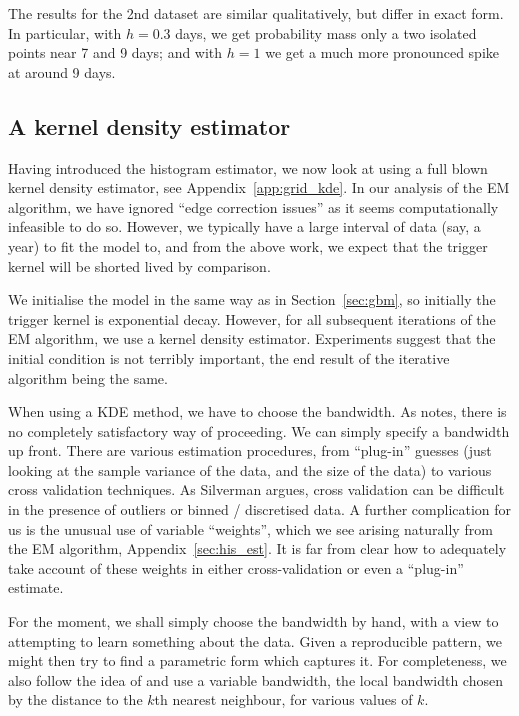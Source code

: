 \documentclass[twoside,a4paper]{article}
\theoremstyle{plain}
\theoremstyle{definition}
\begin{document}
The results for the 2nd dataset are similar qualitatively, but differ in exact form.
In particular, with $h=0.3$ days, we get probability mass only a two isolated points
near 7 and 9 days; and with $h=1$ we get a much more pronounced spike at around 9 days.


\subsection{A kernel density estimator}\label{sec:grid_kde}

Having introduced the histogram estimator, we now look at using a full blown kernel density
estimator, see Appendix~\ref{app:grid_kde}.  In our analysis of the EM algorithm, we have
ignored ``edge correction issues'' as it seems computationally infeasible to do so.  However,
we typically have a large interval of data (say, a year) to fit the model to, and from the above
work, we expect that the trigger kernel will be shorted lived by comparison.

We initialise the model in the same way as in Section~\ref{sec:gbm}, so initially the trigger
kernel is exponential decay.  However, for all subsequent iterations of the EM algorithm,
we use a kernel density estimator.  Experiments suggest that the initial condition is not
terribly important, the end result of the iterative algorithm being the same.

When using a KDE method, we have to choose the bandwidth.  As \cite[Section~3.4]{sil} notes,
there is no completely satisfactory way of proceeding.  We can simply specify a bandwidth
up front.  There are various estimation procedures, from ``plug-in'' guesses (just looking
at the sample variance of the data, and the size of the data) to various cross validation
techniques.  As Silverman argues, cross validation can be difficult in the presence of
outliers or binned / discretised data.  A further complication for us is the unusual use of
variable ``weights'', which we see arising naturally from the EM algorithm,
Appendix~\ref{sec:his_est}.  It is far from clear how to adequately take account of these
weights in either cross-validation or even a ``plug-in'' estimate.

For the moment, we shall simply choose the bandwidth by hand, with a view to attempting to
learn something about the data.  Given a reproducible pattern, we might then try to find
a parametric form which captures it.  For completeness, we also follow the idea of \cite{sepp}
and use a variable bandwidth, the local bandwidth chosen by the distance to the $k$th nearest
neighbour, for various values of $k$.
\end{document}
